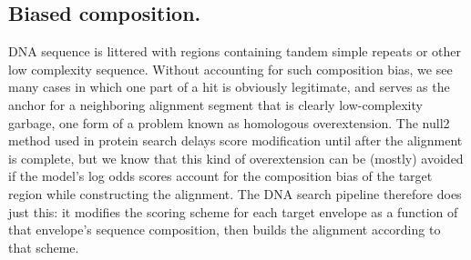 \subsection{Biased composition.}

DNA sequence is littered with regions containing tandem simple repeats
or other low complexity sequence. Without accounting for such
composition bias, we see many cases in which one part of a hit is
obviously legitimate, and serves as the anchor for a neighboring
alignment segment that is clearly low-complexity garbage, one form of
a problem known as homologous overextension.\cite{Gonzalez10} The
null2 method used in protein search delays score modification until
after the alignment is complete, but we know that this kind of
overextension can be (mostly) avoided if the model's log odds scores
account for the composition bias of the target region while
constructing the alignment. The DNA search pipeline therefore does
just this: it modifies the scoring scheme for each target envelope as
a function of that envelope's sequence composition, then builds the
alignment according to that scheme.





